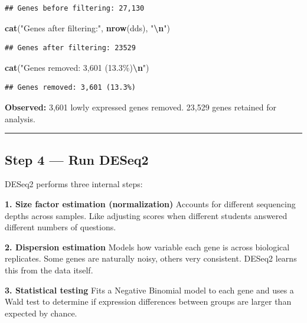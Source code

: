 \documentclass[
]{article}
\newenvironment{Shaded}{\begin{snugshade}}{\end{snugshade}}
\newcommand{\FunctionTok}[1]{\textcolor[rgb]{0.13,0.29,0.53}{\textbf{#1}}}
\newcommand{\NormalTok}[1]{#1}
\newcommand{\SpecialCharTok}[1]{\textcolor[rgb]{0.81,0.36,0.00}{\textbf{#1}}}
\newcommand{\StringTok}[1]{\textcolor[rgb]{0.31,0.60,0.02}{#1}}
\begin{document}
\begin{verbatim}
## Genes before filtering: 27,130
\end{verbatim}

\begin{Shaded}
\begin{Highlighting}[]
\FunctionTok{cat}\NormalTok{(}\StringTok{"Genes after filtering:"}\NormalTok{, }\FunctionTok{nrow}\NormalTok{(dds), }\StringTok{"}\SpecialCharTok{\textbackslash{}n}\StringTok{"}\NormalTok{)}
\end{Highlighting}
\end{Shaded}

\begin{verbatim}
## Genes after filtering: 23529
\end{verbatim}

\begin{Shaded}
\begin{Highlighting}[]
\FunctionTok{cat}\NormalTok{(}\StringTok{"Genes removed: 3,601 (13.3\%)}\SpecialCharTok{\textbackslash{}n}\StringTok{"}\NormalTok{)}
\end{Highlighting}
\end{Shaded}

\begin{verbatim}
## Genes removed: 3,601 (13.3%)
\end{verbatim}

\textbf{Observed:} 3,601 lowly expressed genes removed. 23,529 genes
retained for analysis.

\begin{center}\rule{0.5\linewidth}{0.5pt}\end{center}

\subsection{Step 4 --- Run DESeq2}\label{step-4-run-deseq2}

DESeq2 performs three internal steps:

\textbf{1. Size factor estimation (normalization)} Accounts for
different sequencing depths across samples. Like adjusting scores when
different students answered different numbers of questions.

\textbf{2. Dispersion estimation} Models how variable each gene is
across biological replicates. Some genes are naturally noisy, others
very consistent. DESeq2 learns this from the data itself.

\textbf{3. Statistical testing} Fits a Negative Binomial model to each
gene and uses a Wald test to determine if expression differences between
groups are larger than expected by chance.
\end{document}
